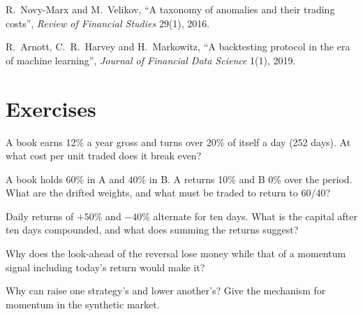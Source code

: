 \begin{omsources}
\item R.~Novy-Marx and M.~Velikov, ``A taxonomy of anomalies and their trading costs'', \emph{Review of Financial Studies} 29(1), 2016.
\item R.~Arnott, C.~R.~Harvey and H.~Markowitz, ``A backtesting protocol in the era of machine learning'', \emph{Journal of Financial Data Science} 1(1), 2019.
\end{omsources}

\section{Exercises}

\begin{exercise}[$\star$]\label{exo:rs:vectorised-backtests:1}
A book earns 12\% a year gross and turns over 20\% of itself a day (252 days). At what cost per unit traded does it break even?
\end{exercise}

\begin{exercise}[$\star$]\label{exo:rs:vectorised-backtests:2}
A book holds 60\% in A and 40\% in B. A returns 10\% and B 0\% over the period. What are the drifted weights, and what must be traded to return to
60/40?
\end{exercise}

\begin{exercise}[$\star$]\label{exo:rs:vectorised-backtests:3}
Daily returns of $+50\%$ and $-40\%$ alternate for ten days. What is the capital after ten days compounded, and what does summing the returns suggest?
\end{exercise}

\begin{exercise}[$\star\star$]\label{exo:rs:vectorised-backtests:4}
Why does the look-ahead  of the reversal lose money while that of a momentum signal including today's return would make it?
\end{exercise}

\begin{exercise}[$\star\star$]\label{exo:rs:vectorised-backtests:5}
Why can  raise one strategy's  and lower another's? Give the mechanism for momentum in the synthetic market.
\end{exercise}

